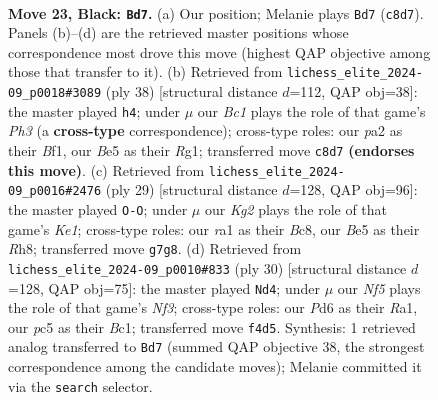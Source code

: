 \documentclass[11pt]{article}
\begin{document}
\clearpage

\begin{figure}[p]\centering
\begin{subfigure}{0.46\textwidth}\centering
\resizebox{\linewidth}{!}{%
\newchessgame
\chessboard[
  setfen={1rbr4/ppp2pk1/3p4/2P1b1qp/N3Pn2/5QPp/PP3P2/RBB1R1K1 b - - 2 23},
  showmover=false,
  pgfstyle=straightmove, color=movearrow, markmove={c8-d7}
]}
\caption{}
\end{subfigure}\hfill
\begin{subfigure}{0.46\textwidth}\centering
\resizebox{\linewidth}{!}{%
\newchessgame
\chessboard[
  setfen={r1b1nrk1/pp4p1/1q2pb2/2ppNp2/2PP1B2/2Q1PP1P/PP4R1/2K2BR1 w - - 0 20},
  showmover=false,
  pgfstyle=straightmove, color=movearrow, markmove={h3-h4}
]}
\caption{}
\end{subfigure}
\\[4pt]
\begin{subfigure}{0.46\textwidth}\centering
\resizebox{\linewidth}{!}{%
\newchessgame
\chessboard[
  setfen={r1b1k2r/1p1pqpbp/p4n2/2pBP1Q1/3n4/2N5/PPP2PPP/R1B1R1K1 b kq - 6 15},
  showmover=false,
  pgfstyle=straightmove, color=movearrow, markmove={e8-g8}
]}
\caption{}
\end{subfigure}\hfill
\begin{subfigure}{0.46\textwidth}\centering
\resizebox{\linewidth}{!}{%
\newchessgame
\chessboard[
  setfen={r1b2rk1/1p2qpb1/2n3pp/p7/P1B1p3/2P2N1P/1P2QPP1/R1BR2K1 w - - 0 16},
  showmover=false,
  pgfstyle=straightmove, color=movearrow, markmove={f3-d4}
]}
\caption{}
\end{subfigure}
\caption{\textbf{Move 23, Black: \texttt{Bd7}.} (a) Our position; Melanie plays \texttt{Bd7} (\texttt{c8d7}). Panels (b)--(d) are the retrieved master positions whose correspondence most drove this move (highest QAP objective among those that transfer to it). (b) Retrieved from \texttt{lichess\_elite\_2024-09\_p0018\#3089} (ply 38) [structural distance $d$=112, QAP obj=38]: the master played \texttt{h4}; under $\mu$ our \emph{Bc1} plays the role of that game's \emph{Ph3} (a \textbf{cross-type} correspondence); cross-type roles: our \emph{p}a2 as their \emph{B}f1, our \emph{B}e5 as their \emph{R}g1; transferred move \texttt{c8d7} \textbf{(endorses this move)}. (c) Retrieved from \texttt{lichess\_elite\_2024-09\_p0016\#2476} (ply 29) [structural distance $d$=128, QAP obj=96]: the master played \texttt{O-O}; under $\mu$ our \emph{Kg2} plays the role of that game's \emph{Ke1}; cross-type roles: our \emph{r}a1 as their \emph{B}c8, our \emph{B}e5 as their \emph{R}h8; transferred move \texttt{g7g8}. (d) Retrieved from \texttt{lichess\_elite\_2024-09\_p0010\#833} (ply 30) [structural distance $d$=128, QAP obj=75]: the master played \texttt{Nd4}; under $\mu$ our \emph{Nf5} plays the role of that game's \emph{Nf3}; cross-type roles: our \emph{P}d6 as their \emph{R}a1, our \emph{p}c5 as their \emph{B}c1; transferred move \texttt{f4d5}. Synthesis: 1 retrieved analog transferred to \texttt{Bd7} (summed QAP objective 38, the strongest correspondence among the candidate moves); Melanie committed it via the \texttt{search} selector.}
\label{fig:thought-m45}
\end{figure}
\end{document}
